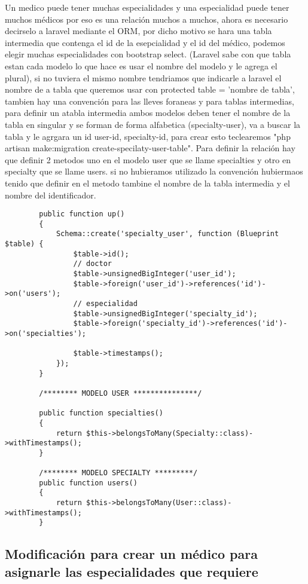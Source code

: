\documentclass[a4paper]{article}
\begin{document}
	Un medico puede tener muchas especialidades y una especialidad puede tener muchos médicos por eso es una relación muchos a muchos, ahora es necesario decirselo a laravel mediante el ORM, por dicho motivo se hara una tabla intermedia que contenga el id de la esepcialidad y el id del médico, podemos elegir muchas especialidades con bootstrap select. (Laravel sabe con que tabla estan cada modelo lo que hace es usar el nombre del modelo y le agrega el plural), si no tuviera el mismo nombre tendriamos que indicarle a laravel el nombre de a tabla que queremos usar con protected table = 'nombre de tabla', tambien hay una convención para las lleves foraneas y para tablas intermedias, para definir un atabla intermedia ambos modelos deben tener el nombre de la tabla en singular y se forman de forma alfabetica (specialty-user), va a buscar la tabla y le agrgara un id user-id, specialty-id, para crear esto teclearemos "php artisan make:migration create-specilaty-user-table". Para definir la relación hay que definir 2 metodos uno en el modelo user que se llame specialties y otro en specialty que se llame users. si no hubieramos utilizado la convención hubiermaos tenido que definir en el metodo tambine el nombre de la tabla intermedia y el nombre del identificador.
	
	\begin{lstlisting}
		public function up()
		{
			Schema::create('specialty_user', function (Blueprint $table) {
				$table->id();
				// doctor
				$table->unsignedBigInteger('user_id');
				$table->foreign('user_id')->references('id')->on('users');
				// especialidad
				$table->unsignedBigInteger('specialty_id');
				$table->foreign('specialty_id')->references('id')->on('specialties');
				
				$table->timestamps();
			});
		}
	
		/******** MODELO USER ***************/
			
		public function specialties()
		{
			return $this->belongsToMany(Specialty::class)->withTimestamps();
		}
	
		/******** MODELO SPECIALTY *********/
		public function users()
		{
			return $this->belongsToMany(User::class)->withTimestamps();
		}
	\end{lstlisting}
	
	
	\subsection{Modificación para crear un médico para asignarle las especialidades que requiere}
	
\end{document}

